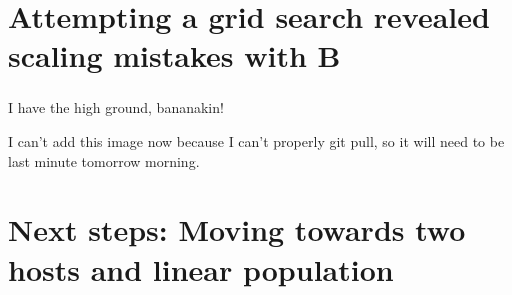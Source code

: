 \documentclass[aspectratio=169]{beamer}
\begin{document}
\section{Attempting a grid search revealed scaling mistakes with B}

\begin{frame} \frametitle{\insertsection}

    I have the high ground, bananakin!

    I can't add this image now because I can't properly git pull,
    so it will need to be last minute tomorrow morning.
    
\end{frame}

\section{Next steps: Moving towards two hosts and linear population}
\end{document}
